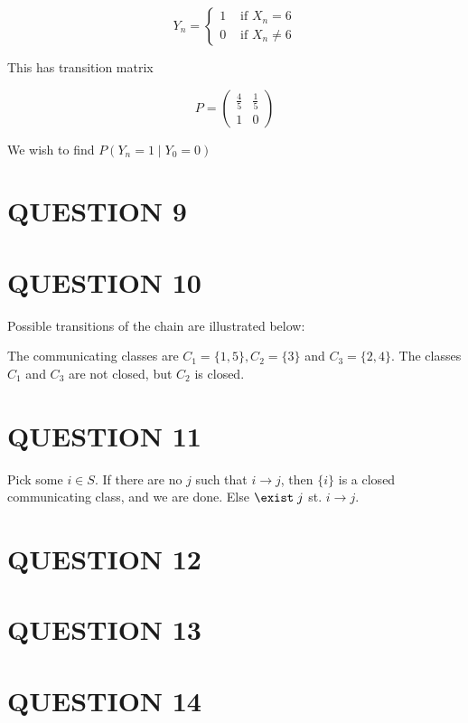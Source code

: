 \documentclass[a4paper]{article}
\begin{document}
\[ Y_{n} = \begin{cases} 1  & \text{ if } X_{n} = 6 \\ 0 & \text{ if } X_{n} \neq 6 \end{cases} \]

This has transition matrix

\[ P = \begin{pmatrix}
\frac{4}{5} & \frac{1}{5} \\
1 & 0
\end{pmatrix} \]

We wish to find $ P(Y_{n} = 1 \; | \; Y_{0} = 0) $

\section{QUESTION 9}
\section{QUESTION 10}

Possible transitions of the chain are illustrated below:
  \begin{center}
\end{center}

The communicating classes are $ C_{1} = \{ 1,5 \}, C_{2} = \{ 3 \} $ and $ C_{3} = \{ 2,4 \} $. The classes $ C_{1} $ and $ C_{3} $ are not closed, but $ C_{2} $ is closed.

\section{QUESTION 11}

Pick some $ i \in S $. If there are no $ j $ such that $ i \to j $, then $ \{ i \} $ is a closed communicating class, and we are done. 
Else $ \exist \; j $ st. $ i \to j $. 

\section{QUESTION 12}





\section{QUESTION 13}
\section{QUESTION 14}
\end{document}
